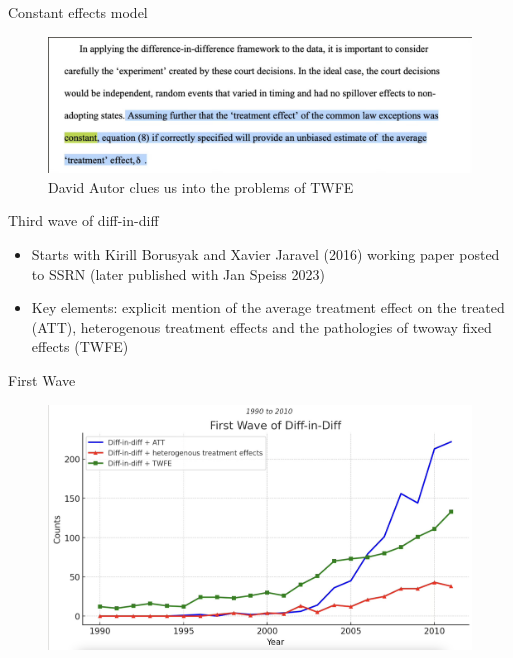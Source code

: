 \documentclass{beamer}
\begin{document}
\begin{frame}{Constant effects model}

	\begin{figure}
	\includegraphics[scale=0.25]{./lecture_includes/autor_quote}
	\caption{David Autor clues us into the problems of TWFE}
	\end{figure}

\end{frame}









\begin{frame}{Third wave of diff-in-diff}

\begin{itemize}

\item Starts with Kirill Borusyak and Xavier Jaravel (2016) working paper posted to SSRN (later published with Jan Speiss 2023)
\item Key elements: explicit mention of the average treatment effect on the treated (ATT), heterogenous treatment effects and the pathologies of twoway fixed effects (TWFE)
\end{itemize}

\end{frame}


\begin{frame}{First Wave}

	\begin{figure}
	\includegraphics[scale=0.15]{./lecture_includes/wave1}
	\end{figure}

\end{frame}
\end{document}
